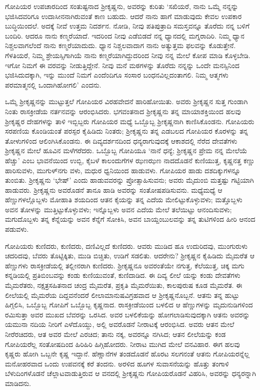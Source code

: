 ಗೋಪಿಯರ ಉಪಚಾರದಿಂದ ಸಂತುಷ್ಟನಾದ ಶ್ರೀಕೃಷ್ಣನು, ಅವರನ್ನು ಕುರಿತು ‘ಸಖಿಯರೆ, ನಾನು ಒಮ್ಮೆ ನನ್ನನ್ನು ಭಜಿಸಿದವರಿಗೂ ಉದಾಸೀನನಾಗಿರುವಂತೆ ಕಾಣ ಬಹುದು. ಆದರೆ ನಾನು ಹಾಗೆ ಮಾಡುವುದು ಕೇವಲ ಉಪಕಾರ ಬುದ್ಧಿಯಿಂದಲೆ. ಅದಕ್ಕೆ ನೀವೆ ಉತ್ತಮ ನಿದರ್ಶನ. ನೋಡಿ, ನೀವು ಪತಿಪುತ್ರಾದಿ ಸಮಸ್ತವನ್ನೂ ತೊರೆದು ನನ್ನ ಬಳಿಗೆ ಬಂದಿರಿ. ಆದರೂ ನಾನು ಕಣ್ಮರೆಯಾದೆ. ಇದರಿಂದ ನೀವು ಎಡೆಬಿಡದೆ ನನ್ನ ಧ್ಯಾನದಲ್ಲಿ ಮಗ್ನರಾದಿರಿ. ನಿಮ್ಮ ಧ್ಯಾನ ನಿಶ್ಚಲವಾಗಲೆಂದೆ ನಾನು ಕಣ್ಮರೆಯಾದುದು. ಧ್ಯಾನ ನಿಶ್ಚಲವಾದಾಗ ನಾನು ಅತ್ಯುತ್ತಮ ಫಲವನ್ನು ಕೊಡುತ್ತೇನೆ. ಗೆಳತಿಯರೆ, ನಿಮ್ಮ ಶ್ರೇಯಸ್ಸಿಗಾಗಿಯೆ ನಾನು ಕಣ್ಮರೆಯಾಗಿದ್ದುದರಿಂದ ನೀವು ನನ್ನ ಮೇಲೆ ಕೋಪ ಮಾಡಿ ಕೊಳ್ಳಬೇಡಿ. ಇಗೋ ನಿಮಗೆ ಈ ವರವನ್ನು ನೀಡುತ್ತಿದ್ದೇನೆ. ನೀವು ಮನೆ ಮಠಗಳನ್ನು ತೊರೆದು ನನ್ನನ್ನು ಒಂದೇ ಮನಸ್ಸಿನಿಂದ ಭಜಿಸಿದುದಕ್ಕಾಗಿ, ಇನ್ನು ಮುಂದೆ ನಿಮಗೆ ಎಂದೆಂದಿಗೂ ಸಂಸಾರ ಬಂಧನವಿಲ್ಲದಂತಾಗಲಿ. ನಿಮ್ಮ ಆತ್ಮಗಳು ಪರಮಾತ್ಮನಲ್ಲಿ ಒಂದಾಗಿಹೋಗಲಿ’ ಎಂದನು.

ಒಮ್ಮೆ ಶ್ರೀಕೃಷ್ಣನನ್ನು ಮುಟ್ಟುತ್ತಲೆ ಗೋಪಿಯರ ವಿರಹವೇದನೆ ಹಾರಿಹೋಯಿತು. ಅವರು ಶ್ರೀಕೃಷ್ಣನ ಸುತ್ತ ಗುಂಡಾಗಿ ನಿಂತು ರಾಸಕ್ರೀಡೆಯ ನರ್ತನವನ್ನು ಆರಂಭಿಸಿದರು. ಭಗವಂತನಾದ ಶ್ರೀಕೃಷ್ಣನು ತನ್ನ ಮಾಯಾಶಕ್ತಿಯಿಂದ ಹಲವು ಶ್ರೀಕೃಷ್ಣರ ದೇಹಗಳನ್ನು ತಾಳಿ ಇಬ್ಬಿಬ್ಬರು ಗೋಪಿಯರ ಮಧ್ಯೆ ಒಬ್ಬೊಬ್ಬ ಶ್ರೀಕೃಷ್ಣನಾಗಿ ಕಾಣಿಸಿಕೊಂಡನು. ಗೋಪಿಯರು ಸರಪಣಿಯ ಕೊಂಡಿಯಂತೆ ಪರಸ್ಪರ ಕೈಹಿಡಿದು ನಿಂತರು; ಶ್ರೀಕೃಷ್ಣನು ತನ್ನ ಎಡಬಲದ ಗೋಪಿಯರ ಕೊರಳನ್ನು ತನ್ನ ತೋಳುಗಳಿಂದ ಆಲಿಂಗಿಸಿಕೊಂಡನು. ಈ ದಿವ್ಯದರ್ಶನದಿಂದ ಧನ್ಯರಾಗುವುದಕ್ಕೆ ಆಕಾಶದಲ್ಲಿ ನೆರೆದ ದೇವತೆಗಳು ಶ್ರೀಕೃಷ್ಣನ ಮೇಲೆ ಹೂವಿನ ಮಳೆಗರೆದರು. ಒಬ್ಬೊಬ್ಬ ಗೋಪಿಯೂ ‘ನಾನೆ ಧನ್ಯೆ; ಶ್ರೀಕೃಷ್ಣನ ಪ್ರೇಮ ನನ್ನ ಮೇಲೆಯೆ ಹೆಚ್ಚು’ ಎಂಬ ಭಾವನೆಯಿಂದ ಉಬ್ಬಿ, ಕೈಬಳೆ ಕಾಲಂದುಗೆಗಳ ಝಣಝಣ ನಾದದೊಡನೆ ಕುಣಿಯುತ್ತ, ಕೃಷ್ಣನತ್ತ ಕಣ್ಣು ಹಾರಿಸುವಳು, ಮುಗುಳ್​ನಗು ವಳು, ಮಧುರ ಧ್ವನಿಯಿಂದ ಹಾಡುವಳು. ಗೋಪಿಯರ ಹಾಡು ದಶದಿಕ್ಕುಗಳನ್ನೂ ತುಂಬಿತು. ಶ್ರೀಕೃಷ್ಣನು ‘ಭೇಷ್​’ ಎಂದು ಹಾಡುವವರನ್ನು ಪ್ರೋತ್ಸಾಹಿಸುವನು; ಅವರು ಮೈದುಂಬಿ ಮತ್ತಷ್ಟು ಗಟ್ಟಿಯಾಗಿ ಹಾಡುವರು. ಶ್ರೀಕೃಷ್ಣನು ಅವರೊಡನೆ ತಾನೂ ಹಾಡಿ ಅವರನ್ನು ಸಂತೋಷಪಡಿಸುವನು. ಮಧ್ಯೆಮಧ್ಯೆ ಆ ಹೆಣ್ಣುಗಳಲ್ಲೊಬ್ಬಳು ಮೋಹಾತಿ ಶಯದಿಂದ ಆತನ ಕೈಯನ್ನು ತನ್ನ ಎದೆಯ ಮೇಲಿಟ್ಟುಕೊಳ್ಳುವಳು; ಮತ್ತೊಬ್ಬಳು ಅವನ ತೋಳನ್ನು ಮುತ್ತಿಟ್ಟುಕೊಳ್ಳುವಳು; ಇನ್ನೊಬ್ಬಳು ಅವನ ಎದೆಯ ಮೇಲೆ ತಲೆಯಿಟ್ಟು ಆನಂದಿಸುವಳು; ಮಗುದೊಬ್ಬಳು ತನ್ನ ಕೆನ್ನೆಯನ್ನು ಅವನ ಕೆನ್ನೆಗೆ ಸೋಕಿಸಿ, ಅವನ ಬಾಯ್ದಂಬುಲವನ್ನು ತನ್ನ ತುಟಿಗಳಿಂದ ಹೀರಿ ಆನಂದ ಪಡುವಳು.

ಗೋಪಿಯರು ಕುಣಿದರು, ಕುಣಿದರು, ದಣಿವಿಲ್ಲದೆ ಕುಣಿದರು. ಆವರು ಮುಡಿದ ಹೂ ಉದುರಿದವು, ಮುಂಗುರುಳು ಚದರಿದವು, ಬೆವರು ತೊಟ್ಟಿಕ್ಕಿತು, ಮುಡಿ ಬಿಚ್ಚಿತು, ಉಡಿಗೆ ಸಡಲಿತು. ಆದರೇನು? ಶ್ರೀಕೃಷ್ಣನ ಕೈಹಿಡಿದು ಮೈಮರೆತ ಆ ಹೆಣ್ಣುಗಳು ರಾಸಕ್ರೀಡೆಯಲ್ಲಿ ತಲ್ಲೀನರಾಗಿ ಕುಣಿದರು. ಶ್ರೀಕೃಷ್ಣನೂ ಅವರಂತೆಯೇ ನಗುತ್ತ, ಕೆಲೆಯುತ್ತ, ಚಿಕ್ಕ ಮಗು ಕನ್ನಡಿಯಲ್ಲಿ ಪ್ರತಿಬಿಂಬವನ್ನು ಕಂಡು ಕುಣಿಯುವಂತೆ, ಕುಣಿದಾಡಿದ. ಈ ದಿವ್ಯ ಲೀಲೆ ಯನ್ನು ಕಂಡು ದೇವತೆಗಳು ಮೈಮರೆತರು, ನಕ್ಷತ್ರಸಹಿತನಾದ ಚಂದ್ರ ಮೈಮರೆತ, ಪ್ರಕೃತಿ ಮೈಮರೆಯಿತು, ಕಾಲಪುರುಷ ಕೂಡ ಮೈಮರೆತ. ಈ ಲೀಲೆಯಲ್ಲಿ ಮೈಮರೆಯ ದಿದ್ದವನೆಂದರೆ ಲೀಲಾಮಾನುಷವಿಗ್ರಹವಾದ ಆ ಶ್ರೀಕೃಷ್ಣನೊಬ್ಬನೆ. ಆತನು ತನ್ನ ಹುಟ್ಟು ಹಿಗ್ಗಲಿಸಿ, ಒಬ್ಬೊಬ್ಬ ಗೋಪಿಗೆ ಒಬ್ಬೊಬ್ಬ ಕೃಷ್ಣನಾದ. ರಾಸಕ್ರೀಡೆಯಿಂದ ಬಳಲಿದ ಆ ಹೆಣ್ಣುಗಳನ್ನು ಮೃದುನುಡಿಗಳಿಂದ ರಮಿಸುತ್ತಾ ಅವರ ಮುಖದ ಬೆವರನ್ನು ಒರಸಿದ. ಅವರ ಬಳಲಿಕೆಯನ್ನು ಹೋಗಲಾಡಿಸುವುದಕ್ಕಾಗಿ ಆತನು ಅವರನ್ನು ಯಮುನಾ ನದಿಯ ನೀರಿಗೆ ಎಳೆದೊಯ್ದು, ಅಲ್ಲಿ ಅವರೊಡನೆ ನೀರಾಟಕ್ಕೆ ಆರಂಭಿಸಿದ. ಅವರು ಆತನ ಮೇಲೆ ನೀರೆರಚಿದರು, ಆತ ಅವರ ಮೇಲೆ ಎರಚಿದ; ತಾನು ನಕ್ಕ, ಅವರನ್ನೂ ನಗಿಸಿದ; ಆತನ ಲೀಲೆಯನ್ನು ಕಂಡ ಗೋಪಿಯರೆಲ್ಲ ಸಂತೋಷದಿಂದ ಹಿರಿಹಿರಿ ಹಿಗ್ಗಿಹೋದರು. ನೀರಾಟ ಮುಗಿದ ಮೇಲೆ ವನವಿಹಾರ. ಈಗ ಹಲವು ಕೃಷ್ಣರು ಹೋಗಿ ಒಬ್ಬನೇ ಕೃಷ್ಣ ಇದ್ದಾನೆ. ಹೆಣ್ಣಾನೆಗಳ ತಂಡದೊಡನೆ ಹೊರಟ ಸಲಗನಂತೆ ಆತನು ಗೋಪಿಯರನ್ನೆಲ್ಲ ಮನೋಹರವಾದ ಒಂದು ಉಪವನಕ್ಕೆ ಕರೆ ತಂದನು. ಅರಳಿದ ಹೂಗಳ ಸುವಾಸನೆಯನ್ನು ಹೊತ್ತು ತಂಗಾಳಿ ಬೆಳುದಿಂಗಳೊಡನೆ ಚೆಲ್ಲಾಟವಾಡುತ್ತಿರುವ ಆ ವನದಲ್ಲಿ ಶ್ರೀಕೃಷ್ಣನು ಗೋಪಿಯರೊಡನೆ ವಿಹರಿಸಿ, ಅವರನ್ನು ಧನ್ಯರನ್ನಾಗಿ ಮಾಡಿದನು.

